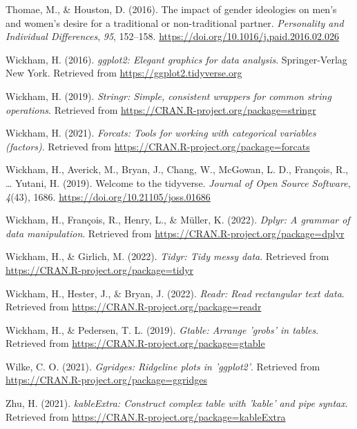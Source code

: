 \documentclass[
  man]{apa6}
\newlength{\cslhangindent}
\newlength{\cslentryspacingunit} %
\newenvironment{CSLReferences}[2] %
 {%
  \setlength{\parindent}{0pt}
  \ifodd #1
  \let\oldpar\par
  \def\par{\hangindent=\cslhangindent\oldpar}
  \fi
  \setlength{\parskip}{#2\cslentryspacingunit}
 }%
 {}
\begin{document}
\begin{CSLReferences}{1}{0}
\leavevmode{}%
Thomae, M., \& Houston, D. (2016). The impact of gender ideologies on men's and women's desire for a traditional or non-traditional partner. \emph{Personality and Individual Differences}, \emph{95}, 152--158. \url{https://doi.org/10.1016/j.paid.2016.02.026}

\leavevmode{}%
Wickham, H. (2016). \emph{ggplot2: Elegant graphics for data analysis}. Springer-Verlag New York. Retrieved from \url{https://ggplot2.tidyverse.org}

\leavevmode{}%
Wickham, H. (2019). \emph{Stringr: Simple, consistent wrappers for common string operations}. Retrieved from \url{https://CRAN.R-project.org/package=stringr}

\leavevmode{}%
Wickham, H. (2021). \emph{Forcats: Tools for working with categorical variables (factors)}. Retrieved from \url{https://CRAN.R-project.org/package=forcats}

\leavevmode{}%
Wickham, H., Averick, M., Bryan, J., Chang, W., McGowan, L. D., François, R., \ldots{} Yutani, H. (2019). Welcome to the {tidyverse}. \emph{Journal of Open Source Software}, \emph{4}(43), 1686. \url{https://doi.org/10.21105/joss.01686}

\leavevmode{}%
Wickham, H., François, R., Henry, L., \& Müller, K. (2022). \emph{Dplyr: A grammar of data manipulation}. Retrieved from \url{https://CRAN.R-project.org/package=dplyr}

\leavevmode{}%
Wickham, H., \& Girlich, M. (2022). \emph{Tidyr: Tidy messy data}. Retrieved from \url{https://CRAN.R-project.org/package=tidyr}

\leavevmode{}%
Wickham, H., Hester, J., \& Bryan, J. (2022). \emph{Readr: Read rectangular text data}. Retrieved from \url{https://CRAN.R-project.org/package=readr}

\leavevmode{}%
Wickham, H., \& Pedersen, T. L. (2019). \emph{Gtable: Arrange 'grobs' in tables}. Retrieved from \url{https://CRAN.R-project.org/package=gtable}

\leavevmode{}%
Wilke, C. O. (2021). \emph{Ggridges: Ridgeline plots in 'ggplot2'}. Retrieved from \url{https://CRAN.R-project.org/package=ggridges}

\leavevmode{}%
Zhu, H. (2021). \emph{kableExtra: Construct complex table with 'kable' and pipe syntax}. Retrieved from \url{https://CRAN.R-project.org/package=kableExtra}

\end{CSLReferences}

\endgroup
\end{document}
